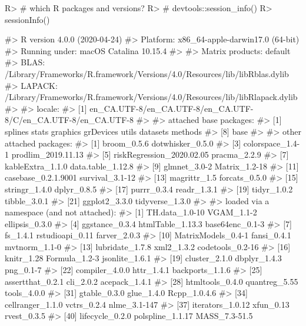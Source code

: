 \documentclass[
]{jss}
\begin{document}
\begin{CodeChunk}

\begin{CodeInput}
R> # which R packages and versions?
R> # devtools::session_info()
R> sessionInfo()
\end{CodeInput}

\begin{CodeOutput}
#> R version 4.0.0 (2020-04-24)
#> Platform: x86_64-apple-darwin17.0 (64-bit)
#> Running under: macOS Catalina 10.15.4
#> 
#> Matrix products: default
#> BLAS:   /Library/Frameworks/R.framework/Versions/4.0/Resources/lib/libRblas.dylib
#> LAPACK: /Library/Frameworks/R.framework/Versions/4.0/Resources/lib/libRlapack.dylib
#> 
#> locale:
#> [1] en_CA.UTF-8/en_CA.UTF-8/en_CA.UTF-8/C/en_CA.UTF-8/en_CA.UTF-8
#> 
#> attached base packages:
#> [1] splines   stats     graphics  grDevices utils     datasets  methods  
#> [8] base     
#> 
#> other attached packages:
#>  [1] broom_0.5.6               dotwhisker_0.5.0         
#>  [3] colorspace_1.4-1          prodlim_2019.11.13       
#>  [5] riskRegression_2020.02.05 pracma_2.2.9             
#>  [7] kableExtra_1.1.0          data.table_1.12.8        
#>  [9] glmnet_3.0-2              Matrix_1.2-18            
#> [11] casebase_0.2.1.9001       survival_3.1-12          
#> [13] magrittr_1.5              forcats_0.5.0            
#> [15] stringr_1.4.0             dplyr_0.8.5              
#> [17] purrr_0.3.4               readr_1.3.1              
#> [19] tidyr_1.0.2               tibble_3.0.1             
#> [21] ggplot2_3.3.0             tidyverse_1.3.0          
#> 
#> loaded via a namespace (and not attached):
#>  [1] TH.data_1.0-10      VGAM_1.1-2          ellipsis_0.3.0     
#>  [4] ggstance_0.3.4      htmlTable_1.13.3    base64enc_0.1-3    
#>  [7] fs_1.4.1            rstudioapi_0.11     farver_2.0.3       
#> [10] MatrixModels_0.4-1  fansi_0.4.1         mvtnorm_1.1-0      
#> [13] lubridate_1.7.8     xml2_1.3.2          codetools_0.2-16   
#> [16] knitr_1.28          Formula_1.2-3       jsonlite_1.6.1     
#> [19] cluster_2.1.0       dbplyr_1.4.3        png_0.1-7          
#> [22] compiler_4.0.0      httr_1.4.1          backports_1.1.6    
#> [25] assertthat_0.2.1    cli_2.0.2           acepack_1.4.1      
#> [28] htmltools_0.4.0     quantreg_5.55       tools_4.0.0        
#> [31] gtable_0.3.0        glue_1.4.0          Rcpp_1.0.4.6       
#> [34] cellranger_1.1.0    vctrs_0.2.4         nlme_3.1-147       
#> [37] iterators_1.0.12    xfun_0.13           rvest_0.3.5        
#> [40] lifecycle_0.2.0     polspline_1.1.17    MASS_7.3-51.5      

\end{CodeOutput}
\end{CodeChunk}
\end{document}
